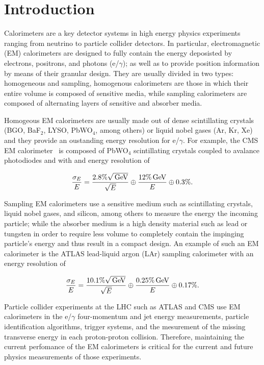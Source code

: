 \chapter{Introduction}
Calorimeters are a key detector systems in high energy physics experiments
ranging from neutrino to particle collider detectors. In
particular, electromagnetic (EM) calorimeters are designed to fully
contain the energy deposisted by electrons, positrons, and photons (e/$\gamma$);
as well as to provide position information by means of their granular
design. They are usually divided in two types: homogeneous and
sampling, homogenous calorimeters are those in which their entire
volume is composed of sensitive media, while sampling calorimeters
are composed of alternating layers of sensitive and absorber
media. 

Homogeous EM calorimeters are usually made out of dense scintillating
crystals (BGO, BaF$_{2}$, LYSO, PbWO$_{4}$, among others) or liquid nobel gases
(Ar, Kr, Xe) and they provide an oustanding energy resolution for
e/$\gamma$. For example, the CMS EM calorimeter~\cite{cmsECAL} is
composed of PbWO$_{4}$ scintillating crystals coupled to avalance
photodiodes and with and energy resolution of

\begin{equation}
\frac{\sigma_{E}}{E} = \frac{2.8\%\sqrt{\,\text{Ge\hspace{-.08em}V}}}{\sqrt{E}} \oplus \frac{12\%\,\text{Ge\hspace{-.08em}V}}{E} \oplus 0.3\%.
\end{equation}

Sampling EM calorimeters use a sensitive medium such as
scintillating crystals, liquid nobel gases, and silicon, among others
to measure the energy the incoming particle;
while the absorber medium is a high density material such as lead or
tungsten in order to require less volume to completely contain the
impinging particle's energy and thus result in a compact design. An
example of such an EM calorimeter is the ATLAS lead-liquid argon (LAr)
sampling calorimeter with an energy resolution of

\begin{equation}
\frac{\sigma_{E}}{E} = \frac{10.1\%\sqrt{\,\text{Ge\hspace{-.08em}V}}}{\sqrt{E}} \oplus \frac{0.25\%\,\text{Ge\hspace{-.08em}V}}{E} \oplus 0.17\%.
\end{equation}

Particle collider experiments at the LHC such as ATLAS and CMS
use EM calorimeters in the e/$\gamma$ four-momentum and jet
energy measurements, particle identification algorithms,
trigger systems, and the mesurement of the missing transverse energy in
each proton-proton collision. Therefore, maintaining the current perfomance of the EM
calorimeters is critical for the current and future physics measurements of those experiments.

